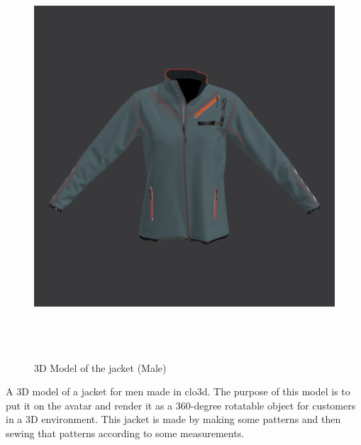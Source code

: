 \begin{figure}[H]
    \centering
    \includegraphics[width=15cm,height=15cm]{Figures/3DJackets/male5.png}
    \caption{3D Model of the jacket (Male)}
    \label{fig5:3D Model of the jacket (Male)}
\end{figure}
\justifying
A 3D model of a jacket for men made in clo3d. The purpose of this model is to put it on the avatar and render it as a 360-degree rotatable object for customers in a 3D environment. This jacket is made by making some patterns and then sewing that patterns according to some measurements.
